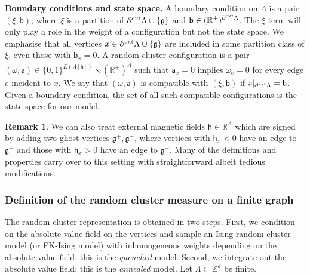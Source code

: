 \documentclass[11pt,a4paper]{article}
\numberwithin{equation}{section}
\theoremstyle{plain}
\theoremstyle{definition}
\newtheorem{Rem}[Thm]{Remark}
\newcommand\fg{\mathfrak{g}}
\begin{document}
\hfill

\noindent\textbf{Boundary conditions and state space.} 
A boundary condition on $\Lambda$ is a pair $(\xi,\mathsf{b})$, where  $\xi$ is a partition of $\partial^{\textup{ext}}\Lambda\cup \{\fg\}$ and $\mathsf b \in (\mathbb R^+)^{\partial^{\textup{ext}} \Lambda}$. The $\xi$ term will only play a role in the weight of a configuration but not the state space. We emphasise that all vertices $x\in \partial^{\textup{ext}}\Lambda\cup \{\fg\}$ are included in some partition class of $\xi$, even those with $\mathsf{b}_x=0$. A random cluster configuration is a pair $(\omega,\mathsf a) \in \{0,1\}^{\overline E(\Lambda[\mathsf h])}\times (\mathbb R^+)^{\overline{\Lambda}} $ such that $\mathsf a_x = 0$ implies $\omega_e=0$ for every edge $e$ incident to $x$. We say that $(\omega,\mathsf a)$ is compatible with $(\xi,\mathsf b)$ if $\mathsf a|_{\partial^{\textup{ext}} \Lambda} = \mathsf b$. Given a boundary condition, the set of all such compatible configurations is the state space for our model.

\begin{Rem}\label{rem:double ghost}
We can also treat external magnetic fields $\mathsf h \in \mathbb R^\Lambda$ which are signed by adding two ghost vertices $\mathfrak g^+, \mathfrak g^-$, where vertices with $\mathsf h_x<0$ have an edge to $\mathfrak g^-$ and those with $\mathsf h_x > 0$ have an edge to $\mathfrak g^+$. Many of the definitions and properties carry over to this setting with straightforward albeit tedious modifications.
\end{Rem}

\subsubsection{Definition of the random cluster measure on a finite graph}

The random cluster representation is obtained in two steps. First, we condition on the absolute value field on the vertices and sample an Ising random cluster model (or FK-Ising model) with inhomogeneous weights depending on the absolute value field: this is the \emph{quenched} model. Second, we integrate out the absolute value field: this is the \emph{annealed} model. Let $\Lambda\subset \mathbb Z^d$ be finite. 

\hfill
\end{document}
